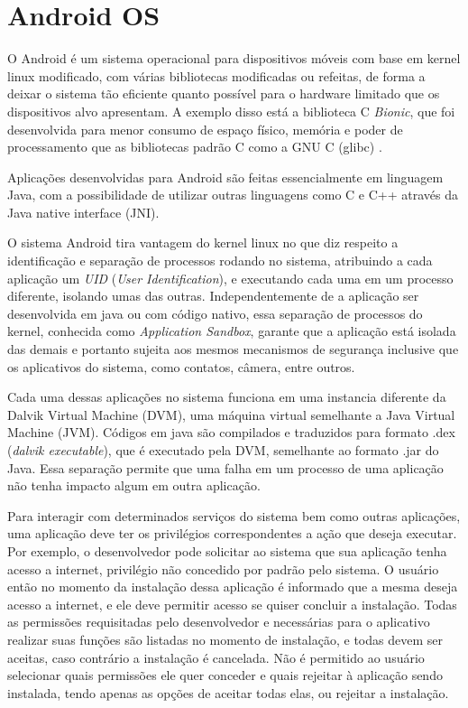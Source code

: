 \chapter[Android OS]{Android OS\footnotemark}
\label{cap:android-os}

O Android é um sistema operacional para dispositivos móveis com base em kernel linux modificado, com várias bibliotecas modificadas ou refeitas, de forma a deixar o sistema tão eficiente quanto possível para o hardware limitado que os dispositivos alvo apresentam. A exemplo disso está a biblioteca C \textit{Bionic}, que foi desenvolvida para menor consumo de espaço físico, memória e poder de processamento que as bibliotecas padrão C como a GNU C (glibc) \cite{devos2014}. 

Aplicações desenvolvidas para Android são feitas essencialmente em linguagem Java, com a possibilidade de utilizar outras linguagens como C e C++ através da Java native interface (JNI). 

O sistema Android tira vantagem do kernel linux no que diz respeito a identificação e separação de processos rodando no sistema, atribuindo a cada aplicação um \textit{UID} (\textit{User Identification}), e executando cada uma em um processo diferente, isolando umas das outras.  Independentemente de a aplicação ser desenvolvida em java ou com código nativo, essa separação de processos do kernel, conhecida como \textit{Application Sandbox}, garante que a aplicação está isolada das demais e portanto sujeita aos mesmos mecanismos de segurança inclusive que os aplicativos do sistema, como contatos, câmera, entre outros. 

Cada uma dessas aplicações no sistema funciona em uma instancia diferente da Dalvik Virtual Machine (DVM), uma máquina virtual semelhante a Java Virtual Machine (JVM). Códigos em java são compilados e traduzidos para formato .dex (\textit{dalvik executable}), que é executado pela DVM, semelhante ao formato .jar do Java. Essa separação permite que uma falha em um processo de uma aplicação não tenha impacto algum em outra aplicação. 

Para interagir com determinados serviços do sistema bem como outras aplicações, uma aplicação deve ter os privilégios correspondentes a ação que deseja executar. Por exemplo, o desenvolvedor pode solicitar ao sistema que sua aplicação tenha acesso a internet, privilégio não concedido por padrão pelo sistema. O usuário então no momento da instalação dessa aplicação é informado que a mesma deseja acesso a internet, e ele deve permitir acesso se quiser concluir a instalação. Todas as permissões requisitadas pelo desenvolvedor e necessárias para o aplicativo realizar suas funções são listadas no momento de instalação, e todas devem ser aceitas, caso contrário a instalação é cancelada. Não é permitido ao usuário selecionar quais permissões ele quer conceder e quais rejeitar à aplicação sendo instalada, tendo apenas as opções de aceitar todas elas, ou rejeitar a instalação. 

